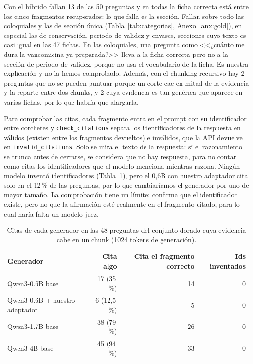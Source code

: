 Con el híbrido fallan 13 de las 50 preguntas y en todas la ficha correcta está entre los cinco fragmentos recuperados: lo que falla es la sección. Fallan sobre todo las coloquiales y las de sección única (Tabla~\ref{tab:categorias}, Anexo~\ref{anx:gold}), en especial las de conservación, periodo de validez y envases, secciones cuyo texto es casi igual en las 47 fichas. En las coloquiales, una pregunta como <<¿cuánto me dura la vancomicina ya preparada?>> lleva a la ficha correcta pero no a la sección de periodo de validez, porque no usa el vocabulario de la ficha. Es nuestra explicación y no la hemos comprobado. Además, con el chunking recursivo hay 2 preguntas que no se pueden puntuar porque un corte cae en mitad de la evidencia y la reparte entre dos chunks, y 2 cuya evidencia es tan genérica que aparece en varias fichas, por lo que habría que alargarla.

Para comprobar las citas, cada fragmento entra en el prompt con su identificador entre corchetes y \texttt{check\_citations} separa los identificadores de la respuesta en válidos (existen entre los fragmentos devueltos) e inválidos, que la API devuelve en \texttt{invalid\_citations}. Solo se mira el texto de la respuesta: si el razonamiento se trunca antes de cerrarse, se considera que no hay respuesta, para no contar como citas los identificadores que el modelo menciona mientras razona. Ningún modelo inventó identificadores (Tabla~\ref{tab:citas}), pero el 0,6B con nuestro adaptador cita solo en el 12\,\% de las preguntas, por lo que cambiaríamos el generador por uno de mayor tamaño. La comprobación tiene un límite: confirma que el identificador existe, pero no que la afirmación esté realmente en el fragmento citado, para lo cual haría falta un modelo juez.

\begin{table}[H]
    \centering
    \caption{Citas de cada generador en las 48 preguntas del conjunto dorado cuya evidencia cabe en un chunk (1024 tokens de generación).}
    \label{tab:citas}
    \small
    \begin{tabular}{lrrr}
        \toprule
        Generador & Cita algo & Cita el fragmento correcto & Ids inventados \\
        \midrule
        Qwen3-0.6B base               & 17 (35\,\%)   & 14 & 0 \\
        Qwen3-0.6B + nuestro adaptador & 6 (12,5\,\%) & 5  & 0 \\
        Qwen3-1.7B base               & 38 (79\,\%)   & 26 & 0 \\
        Qwen3-4B base                 & 45 (94\,\%)   & 33 & 0 \\
        \bottomrule
    \end{tabular}
\end{table}
